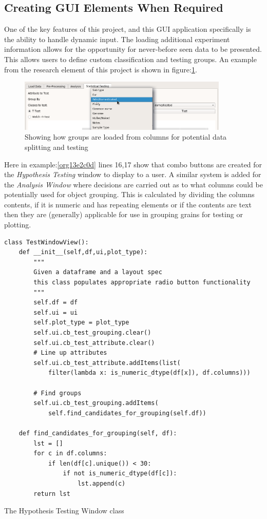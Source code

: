 \documentclass[11pt]{report}
\begin{document}
\subsection{Creating GUI Elements When Required}
\label{sec:org317a1b5}

One of the key features of this project, and this GUI application specifically is the ability to handle dynamic input. The loading additional experiment information allows for the opportunity for never-before seen data to be presented. This allows users to define custom classification and testing groups. An example from the research element of this project is shown in figure:\ref{fig:orgbe7fc79}.

\begin{figure}[htbp]
\centering
\includegraphics[width=10cm]{./images/dynamicselection.png}
\caption{\label{fig:orgbe7fc79}
Showing how groups are loaded from columns for potential data splitting and testing}
\end{figure}

Here in example:\ref{org13e2c0d} lines 16,17 show that combo buttons are created for the \emph{Hypothesis Testing} window to display to a user. A similar system is added for the \emph{Analysis Window} where decisions are carried out as to what columns could be potentially used for object grouping. This is calculated by dividing the columns contents, if it is numeric and has repeating elements or if the contents are text then they are (generally) applicable for use in grouping grains for testing or plotting.

\begin{listing}[htbp]
\begin{verbatim}
class TestWindowView():
    def __init__(self,df,ui,plot_type):
        """
        Given a dataframe and a layout spec
        this class populates appropriate radio button functionality
        """
        self.df = df
        self.ui = ui
        self.plot_type = plot_type
        self.ui.cb_test_grouping.clear()
        self.ui.cb_test_attribute.clear()
        # Line up attributes
        self.ui.cb_test_attribute.addItems(list(
            filter(lambda x: is_numeric_dtype(df[x]), df.columns)))

        # Find groups
        self.ui.cb_test_grouping.addItems(
            self.find_candidates_for_grouping(self.df))

    def find_candidates_for_grouping(self, df):
        lst = []
        for c in df.columns:
            if len(df[c].unique()) < 30:
                if not is_numeric_dtype(df[c]):
                    lst.append(c)
        return lst
\end{verbatim}
\caption{\label{org13e2c0d}
The Hypothesis Testing Window class}
\end{listing}
\end{document}
